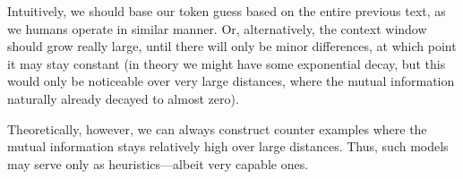 \documentclass[../../main.tex]{subfiles}
\begin{document}
    Intuitively, we should base our token guess based on the entire previous text, as we humans operate in similar manner. Or, alternatively, the context window should grow really large, until there will only be minor differences, at which point it may stay constant (in theory we might have some exponential decay, but this would only be noticeable over very large distances, where the mutual information naturally already decayed to almost zero).

    Theoretically, however, we can always construct counter examples where the mutual information stays relatively high over large distances. Thus, such models may serve only as heuristics—albeit very capable ones.

\end{document}
